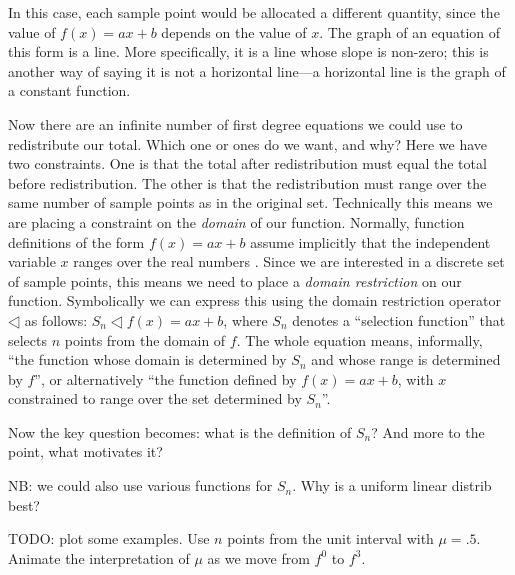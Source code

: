 In this case, each sample point would be allocated a different
quantity, since the value of \(f(x)=ax+b\) depends on the value of
\(x\).  The graph of an equation of this form is a line.  More
specifically, it is a line whose slope is non-zero; this is another
way of saying it is not a horizontal line---a horizontal line is the
graph of a constant function.

Now there are an infinite number of first degree equations we could
use to redistribute our total.  Which one or ones do we want, and why?
Here we have two constraints.  One is that the total after
redistribution must equal the total before redistribution.  The other
is that the redistribution must range over the same number of sample
points as in the original set.  Technically this means we are placing
a constraint on the \emph{domain} of our function.  Normally, function
definitions of the form \(f(x)=ax+b\) assume implicitly that the
independent variable \(x\) ranges over the real numbers \R.  Since we
are interested in a discrete set of sample points, this means we need to
place a \emph{domain restriction} on our function.  Symbolically we
can express this using the domain restriction operator  \(\dres\) as follows: \(S_n
\dres f(x)=ax+b\), where \(S_n\) denotes a ``selection function'' that
selects \(n\) points from the domain of \(f\).  The whole equation
means, informally, ``the function whose domain is determined by
\(S_n\) and whose range is determined by \(f\)'', or alternatively
``the function defined by \(f(x)=ax+b\), with \(x\) constrained to
range over the set determined by \(S_n\)''.

Now the key question becomes: what is the definition of \(S_n\)?  And
more to the point, what motivates it?

\begin{ednote}
  NB: we could also use various functions for \(S_n\).  Why is a
  uniform linear distrib best?

  TODO: plot some examples.  Use \(n\) points from the unit interval
  with \(\mu=.5\).  Animate the interpretation of \(\mu\) as we move
  from \(f^0\) to \(f^3\).
\end{ednote}


